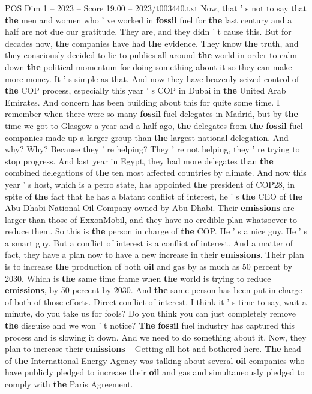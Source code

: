 \begin{textsample}{POS Dim 1 – 2023 – Score 19.00 – 2023/t003440.txt}
Now, that ' s not to say that \textbf{the} men and women who ' ve worked in \textbf{fossil} fuel for \textbf{the} last century and a half are not due our gratitude.
They are, and they didn ' t cause this.
But for decades now, \textbf{the} companies have had \textbf{the} evidence.
They know \textbf{the} truth, and they consciously decided to lie to publics all around \textbf{the} world in order to calm down \textbf{the} political momentum for doing something about it so they can make more money.
It ' s simple as that.
And now they have brazenly seized control of \textbf{the} COP process, especially this year ' s COP in Dubai in \textbf{the} United Arab Emirates.
And concern has been building about this for quite some time.
I remember when there were so many \textbf{fossil} fuel delegates in Madrid, but by \textbf{the} time we got to Glasgow a year and a half ago, \textbf{the} delegates from \textbf{the} \textbf{fossil} fuel companies made up a larger group than \textbf{the} largest national delegation.
And why?
Why?
Because they ' re helping?
They ' re not helping, they ' re trying to stop progress.
And last year in Egypt, they had more delegates than \textbf{the} combined delegations of \textbf{the} ten most affected countries by climate.
And now this year ' s host, which is a petro state, has appointed \textbf{the} president of COP28, in spite of \textbf{the} fact that he has a blatant conflict of interest, he ' s \textbf{the} CEO of \textbf{the} Abu Dhabi National Oil Company owned by Abu Dhabi.
Their \textbf{emissions} are larger than those of ExxonMobil, and they have no credible plan whatsoever to reduce them.
So this is \textbf{the} person in charge of \textbf{the} COP.
He ' s a nice guy.
He ' s a smart guy.
But a conflict of interest is a conflict of interest.
And a matter of fact, they have a plan now to have a new increase in their \textbf{emissions}.
Their plan is to increase \textbf{the} production of both \textbf{oil} and gas by as much as 50 percent by 2030.
Which is \textbf{the} same time frame when \textbf{the} world is trying to reduce \textbf{emissions}, by 50 percent by 2030.
And \textbf{the} same person has been put in charge of both of those efforts.
Direct conflict of interest.
I think it ' s time to say, wait a minute, do you take us for fools?
Do you think you can just completely remove \textbf{the} disguise and we won ' t notice? \textbf{The} \textbf{fossil} fuel industry has captured this process and is slowing it down.
And we need to do something about it.
Now, they plan to increase their \textbf{emissions} -- Getting all hot and bothered here. \textbf{The} head of \textbf{the} International Energy Agency was talking about several \textbf{oil} companies who have publicly pledged to increase their \textbf{oil} and gas and simultaneously pledged to comply with \textbf{the} Paris Agreement.

\end{textsample}
